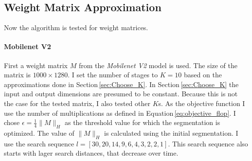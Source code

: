 \documentclass[doctype=mastersthesis,BCOR=15mm,biblatex]{ldvbook}%
\begin{document}
\subsection{Weight Matrix Approximation}
Now the algorithm is tested for weight matrices.


\paragraph{Mobilenet V2}
First a weight matrix $M$ from the \emph{Mobilenet V2} model is used.
The size of the matrix is ${1000 \times 1280}$.
I set the number of stages to $K = 10$ based on the approximations done in Section\,\ref{sec:Choose_K}.
In Section\,\ref{sec:Choose_K} the input and output dimensions are presumed to be constant.
Because this is not the case for the tested matrix, I also tested other $K$s.
As the objective function I use the number of multiplications as defined in Equation\,\ref{eq:objective_flop}.
I chose $\epsilon = \frac{1}{4} \|M\|_H$ as the threshold value for which the segmentation is optimized.
The value of $\|M\|_H$ is calculated using the initial segmentation.
I use the search sequence $l = [30, 20, 14,  9,  6,  4,  3,  2,  2,  1]$.
This search sequence also starts with lager search distances, that decrease over time.
\end{document}
